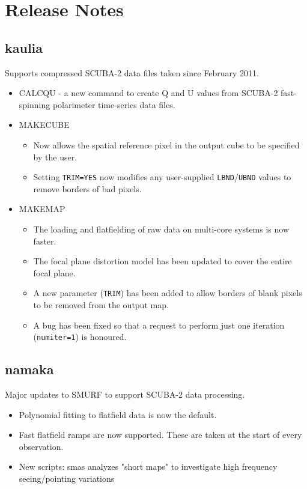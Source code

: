 \documentclass[twoside,11pt]{article}
\renewcommand{\_}{\texttt{\symbol{95}}}
\begin{document}
\section{Release Notes}

\subsection{kaulia}

Supports compressed SCUBA-2 data files taken since February 2011.

\begin{itemize}
\item CALCQU - a new command to create Q and U values from SCUBA-2
  fast-spinning polarimeter time-series data files.
\item MAKECUBE
\begin{itemize}
\item Now allows the spatial reference pixel in the output cube to be
  specified by the user.
\item Setting \texttt{TRIM=YES} now modifies any user-supplied
  \texttt{LBND}/\texttt{UBND} values to remove borders of bad pixels.
\end{itemize}
\item MAKEMAP
\begin{itemize}
\item The loading and flatfielding of raw data on multi-core systems
  is now faster.
\item The focal plane distortion model has been updated to cover the
  entire focal plane.
\item A new parameter (\texttt{TRIM}) has been added to allow borders
  of blank pixels to be removed from the output map.
\item A bug has been fixed so that a request to perform just one
  iteration (\texttt{numiter=1}) is honoured.
\end{itemize}
\end{itemize}

\subsection{namaka}

Major updates to SMURF to support SCUBA-2 data processing.

\begin{itemize}
\item Polynomial fitting to flatfield data is now the default.
\item Fast flatfield ramps are now supported. These are taken at the
  start of every observation.
\item New scripts: smas analyzes "short maps" to investigate high
  frequency seeing/pointing variations
\end{itemize}
\end{document}
